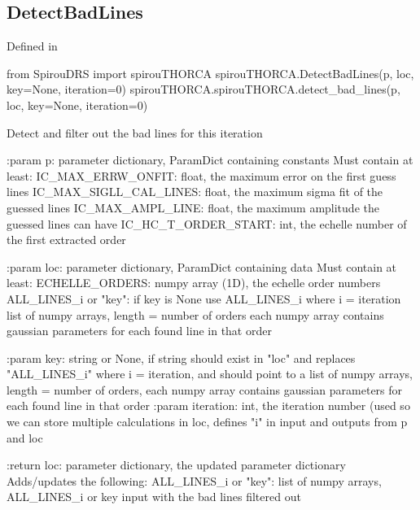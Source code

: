 \noindent\begin{minipage}{\textwidth}
\subsection{DetectBadLines}

Defined in \spirouTHORCA{}

\begin{pythonbox}
from SpirouDRS import spirouTHORCA
spirouTHORCA.DetectBadLines(p, loc, key=None, iteration=0)
spirouTHORCA.spirouTHORCA.detect_bad_lines(p, loc, key=None, iteration=0)
\end{pythonbox}

\begin{pythondocstring}
Detect and filter out the bad lines for this iteration

:param p: parameter dictionary, ParamDict containing constants
    Must contain at least:
        IC_MAX_ERRW_ONFIT: float, the maximum error on the first guess
                           lines
        IC_MAX_SIGLL_CAL_LINES: float, the maximum sigma fit of the guessed
                                lines
        IC_MAX_AMPL_LINE: float, the maximum amplitude the guessed lines
                          can have
        IC_HC_T_ORDER_START: int, the echelle number of the first
                             extracted order

:param loc: parameter dictionary, ParamDict containing data
    Must contain at least:
        ECHELLE_ORDERS: numpy array (1D), the echelle order numbers
        ALL_LINES_i or "key": if key is None use ALL_LINES_i
                              where i = iteration
                     list of numpy arrays, length = number of orders
                     each numpy array contains gaussian parameters
                     for each found line in that order

:param key: string or None, if string should exist in "loc" and replaces
            "ALL_LINES_i" where i = iteration, and should point to a list
            of numpy arrays, length = number of orders, each numpy array
            contains gaussian parameters for each found line in that order
:param iteration: int, the iteration number (used so we can store multiple
                  calculations in loc, defines "i" in input and outputs
                  from p and loc

:return loc: parameter dictionary, the updated parameter dictionary
    Adds/updates the following:
        ALL_LINES_i or "key": list of numpy arrays, ALL_LINES_i or key input
                              with the bad lines filtered out


\end{pythondocstring}
\end{minipage}
